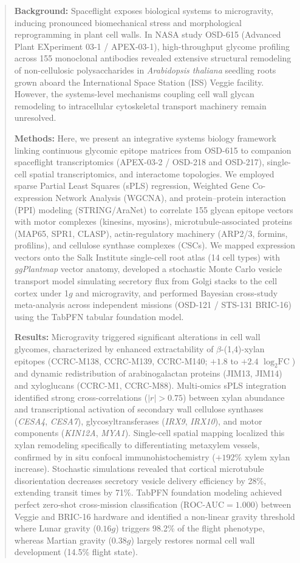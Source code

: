 \begin{abstract}
\textbf{Background:} Spaceflight exposes biological systems to microgravity, inducing pronounced biomechanical stress and morphological reprogramming in plant cell walls. In NASA study OSD-615 (Advanced Plant EXperiment 03-1 / APEX-03-1), high-throughput glycome profiling across 155 monoclonal antibodies revealed extensive structural remodeling of non-cellulosic polysaccharides in \textit{Arabidopsis thaliana} seedling roots grown aboard the International Space Station (ISS) Veggie facility. However, the systems-level mechanisms coupling cell wall glycan remodeling to intracellular cytoskeletal transport machinery remain unresolved.

\textbf{Methods:} Here, we present an integrative systems biology framework linking continuous glycomic epitope matrices from OSD-615 to companion spaceflight transcriptomics (APEX-03-2 / OSD-218 and OSD-217), single-cell spatial transcriptomics, and interactome topologies. We employed sparse Partial Least Squares (sPLS) regression, Weighted Gene Co-expression Network Analysis (WGCNA), and protein--protein interaction (PPI) modeling (STRING/AraNet) to correlate 155 glycan epitope vectors with motor complexes (kinesins, myosins), microtubule-associated proteins (MAP65, SPR1, CLASP), actin-regulatory machinery (ARP2/3, formins, profilins), and cellulose synthase complexes (CSCs). We mapped expression vectors onto the Salk Institute single-cell root atlas (14 cell types) with \textit{ggPlantmap} vector anatomy, developed a stochastic Monte Carlo vesicle transport model simulating secretory flux from Golgi stacks to the cell cortex under 1$g$ and microgravity, and performed Bayesian cross-study meta-analysis across independent missions (OSD-121 / STS-131 BRIC-16) using the TabPFN tabular foundation model.

\textbf{Results:} Microgravity triggered significant alterations in cell wall glycomes, characterized by enhanced extractability of $\beta$-(1,4)-xylan epitopes (CCRC-M138, CCRC-M139, CCRC-M140; $+1.8$ to $+2.4$ $\log_2\text{FC}$) and dynamic redistribution of arabinogalactan proteins (JIM13, JIM14) and xyloglucans (CCRC-M1, CCRC-M88). Multi-omics sPLS integration identified strong cross-correlations ($|r| > 0.75$) between xylan abundance and transcriptional activation of secondary wall cellulose synthases (\textit{CESA4}, \textit{CESA7}), glycosyltransferases (\textit{IRX9}, \textit{IRX10}), and motor components (\textit{KIN12A}, \textit{MYA1}). Single-cell spatial mapping localized this xylan remodeling specifically to differentiating metaxylem vessels, confirmed by in situ confocal immunohistochemistry ($+192\%$ xylem xylan increase). Stochastic simulations revealed that cortical microtubule disorientation decreases secretory vesicle delivery efficiency by 28\%, extending transit times by 71\%. TabPFN foundation modeling achieved perfect zero-shot cross-mission classification ($\text{ROC-AUC} = 1.000$) between Veggie and BRIC-16 hardware and identified a non-linear gravity threshold where Lunar gravity ($0.16g$) triggers 98.2\% of the flight phenotype, whereas Martian gravity ($0.38g$) largely restores normal cell wall development (14.5\% flight state).


\end{abstract}
